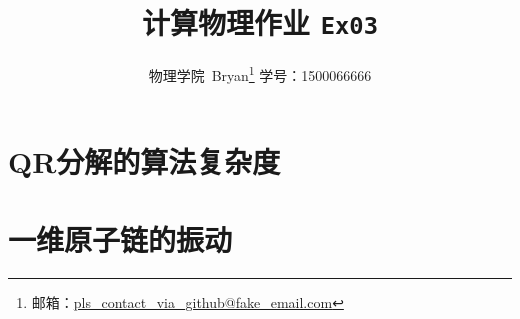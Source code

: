 \documentclass[a4paper,10pt]{article}
\title{计算物理作业 \texttt{Ex03}}
\author{物理学院\ Bryan\thanks{%
		邮箱：\url{pls_contact_via_github@fake_email.com}}\quad
		学号：\!\textup{1500066666}}
\date{}
\begin{document}
\maketitle
\pagestyle{headings}
\thispagestyle{empty}
\appendix
\section{QR分解的算法复杂度}
	
\section{一维原子链的振动}
	


\clearpage
%
%
\end{document}
